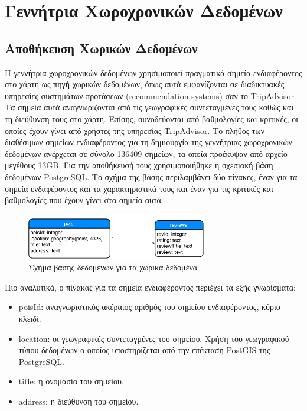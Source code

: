 \chapter{Γεννήτρια Χωροχρονικών Δεδομένων}

\section{Αποθήκευση Χωρικών Δεδομένων}

Η γεννήτρια χωροχρονικών δεδομένων χρησιμοποιεί πραγματικά σημεία ενδιαφέροντος στο χάρτη ως πηγή χωρικών δεδομένων, όπως αυτά εμφανίζονται σε διαδικτυακές υπηρεσίες 
συστημάτων προτάσεων (recommendation systems) σαν το TripAdvisor \cite{1}. Τα σημεία αυτά αναγνωρίζονται από τις γεωγραφικές συντεταγμένες τους καθώς και τη 
διεύθυνση τους στο χάρτη. Επίσης, συνοδεύονται από βαθμολογίες και κριτικές, οι οποίες έχουν γίνει από χρήστες της υπηρεσίας TripAdvisor. Το πλήθος των  
διαθέσιμων σημείων ενδιαφέροντος για τη δημιουργία της γεννήτριας χωροχρονικών δεδομένων ανέρχεται σε σύνολο 136409 σημείων, τα οποία προέκυψαν από αρχείο 
μεγέθους 13GB. Για την αποθήκευσή τους χρησιμοποιήθηκε 
η σχεσιακή βάση δεδομένων PostgreSQL. Το σχήμα της βάσης περιλαμβάνει δύο πίνακες, έναν για τα σημεία ενδαφέροντος και τα χαρακτηριστικά τους και έναν για τις κριτικές και 
βαθμολογίες που έχουν γίνει στα σημεία αυτά. 

\begin{figure}[H]
  \centering
  \includegraphics[width=0.7\textwidth]{figures/schema.png}
  \caption{Σχήμα βάσης δεδομένων για τα χωρικά δεδομένα}
\end{figure}

Πιο αναλυτικά, ο πίνακας για τα σημεία ενδιαφέροντος περιέχει τα εξής γνωρίσματα:

\begin{itemize}
 \item poisId: αναγνωριστικός ακέραιος αριθμός του σημείου ενδιαφέροντος, κύριο κλειδί.
 \item location: οι γεωγραφικές συντεταγμένες του σημείου. Χρήση του γεωγραφικού τύπου δεδομένων ο οποίος υποστηρίζεται από την επέκταση PostGIS της PostgreSQL.
 \item title: η ονομασία του σημείου.
 \item address: η διεύθυνση του σημείου.
\end{itemize}

